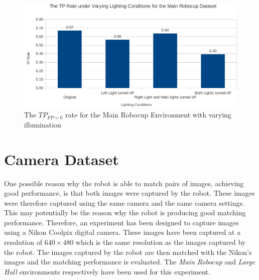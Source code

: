 \documentclass{report}
\begin{document}
\begin{figure}[h!] 
  \centering
    \includegraphics[width=1.0\textwidth]{../Drawings/Graphs/tp_rate_lighting.pdf}
    \caption{The $TP_{FP=0}$ rate for the Main Robocup Environment with varying illumination}
    \label{fig:tp_rate_lighting}
\end{figure}






\section{Camera Dataset}
\label{sec:cameraMatching}
One possible reason why the robot is able to match pairs of images, achieving good performance, is that both images were captured by the robot. These images were therefore captured using the same camera and the same camera settings. This may potentially be the reason why the robot is producing good matching performance. Therefore, an experiment has been designed to capture images using a Nikon Coolpix digital camera. These images have been captured at a resolution of $640 \times 480$ which is the same resolution as the images captured by the robot. The images captured by the robot are then matched with the Nikon's images and the matching performance is evaluated. The \textit{Main Robocup} and \textit{Large Hall} environments respectively have been used for this experiment.\\
\end{document}

